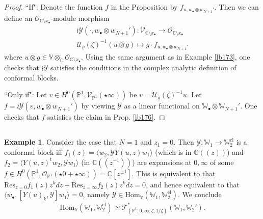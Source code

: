 \documentclass[11pt,b5paper,notitlepage]{article}
\theoremstyle{definition}
\newtheorem{eg}[df]{Example}
\theoremstyle{plain}
\newcommand{\mc}{\mathcal}
\newcommand{\tr}{\mathrm{t}} %
\newcommand{\Hom}{\mathrm{Hom}}
\newcommand{\Res}{\mathrm{Res}}
\newcommand{\bk}[1]{\langle {#1}\rangle}
\newcommand{\scr}{\mathscr}
\newcommand{\blt}{\bullet}
\newcommand{\Vbb}{\mathbb V}
\newcommand{\Wbb}{\mathbb W}
\newcommand{\Cbb}{\mathbb C}
\newcommand{\Pbb}{\mathbb P}
\newcommand{\cl}{\mathrm{cl}}
\numberwithin{equation}{section}
\begin{document}
\begin{proof}
``If": Denote the function $f$ in the Proposition by $f_{u,w_\blt\otimes w_{N+1}'}$. Then we can define an $\scr O_{\Cbb\setminus x_\blt}$-module morphism
\begin{gather*}
\wr\mc Y(\cdot,w_\blt\otimes w_{N+1}'):\scr V_{\Cbb\setminus x_\blt}\rightarrow\scr O_{\Cbb\setminus x_\blt}\\
\mc U_\varrho(\zeta)^{-1}(u\otimes g)\mapsto g\cdot f_{u,w_\blt\otimes w_{N+1}'}
\end{gather*}
where $u\otimes g\in \Vbb\otimes_\Cbb\scr O_{\Cbb\setminus x_\blt}$. Using the same argument as in Example \ref{lb173}, one checks that $\wr\mc Y$ satisfies the conditions in the complex analytic definition of conformal blocks.

``Only if": Let $v\in H^0(\Pbb^1,\scr V_{\Pbb^1}(\star\infty))$ be $v=\mc U_\varrho(\zeta)^{-1}u$. Let $f=\wr\mc Y(v,w_\blt\otimes w_{N+1}')$ by viewing $\mc Y$ as a linear functional on $\Wbb_\blt\otimes\Wbb_{N+1}'$. One checks that $f$  satisfies the claim in Prop. \ref{lb176}.
\end{proof}








\subsection{}





\begin{eg}\label{lb179}
Consider the case that $N=1$ and $z_1=0$. Then $\mc Y:\Wbb_1\rightarrow\Wbb_2^\cl$ is a conformal block iff $f_1(z)=\bk{w_2,\mc YY(u,z)w_1}$ (which is in $\Cbb((z))$) and $f_2=\bk{Y(u,z)^\tr w_2,\mc Yw_1}$ (in $\Cbb((z^{-1}))$) are expansions at $0,\infty$ of some $f\in H^0(\Pbb^1,\scr O_{\Pbb^1}(\star0+\star\infty))=\Cbb[z^{\pm1}]$. This is equivalent to that  $\Res_{z=0} f_1(z)z^kdz+\Res_{z=\infty}f_2(z)z^kdz=0$, and hence equivalent to that $\bk{w_\blt,[Y(u)_k,\mc Y]w_1}=0$, namely $\mc Y\in\Hom_\Vbb(\Wbb_1,\Wbb_2^\cl)$. We conclude
\begin{align}
\Hom_\Vbb(\Wbb_1,\Wbb_2^\cl)\simeq\scr T_{(\Pbb^1;0,\infty;\zeta,1/\zeta)}^*(\Wbb_1,\Wbb_2').
\end{align} 
\hfill\qedsymbol
\end{eg}
\end{document}
